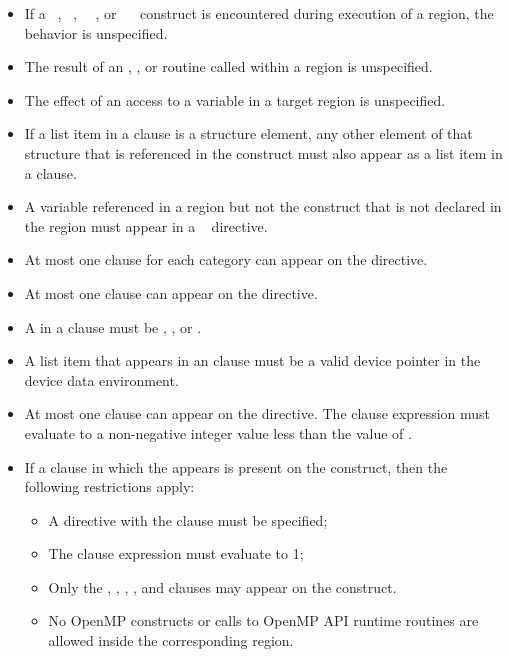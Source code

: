\restrictions
\begin{itemize}
\item If a ~, ~, 
      ~~, or 
      ~~ construct is encountered during
      execution of a  region, the behavior is unspecified.
\item The result of an , , 
      or  routine called within a  region 
      is unspecified.
\item The effect of an access to a  variable in a target region 
      is unspecified.
\item If a list item in a  clause is a structure element, any other
      element of that structure that is referenced in the  construct
      must also appear as a list item in a  clause.
\item A variable referenced in a  region but not the  
      construct that is not declared in the  region must appear in 
      a ~ directive.
\item At most one  clause for each category can appear on the 
      directive.
\item At most one  clause can appear on the directive.
\item A  in a  clause must be , , 
       or .
\item A list item that appears in an  clause must be a valid 
      device pointer in the device data environment.
\item At most one  clause can appear on the directive. The  
      clause expression must evaluate to a non-negative integer value less than the 
      value of .
\item If a  clause in which the   
      appears is present on the construct, then the following restrictions apply:

\begin{itemize}
\item A  directive with the  clause must 
      be specified;
\item The  clause expression must evaluate to 1;
\item Only the , , ,
      , and  clauses may appear on the construct.
\item No OpenMP constructs or calls to OpenMP API runtime routines are allowed
      inside the corresponding  region.
\end{itemize}


\end{itemize}

